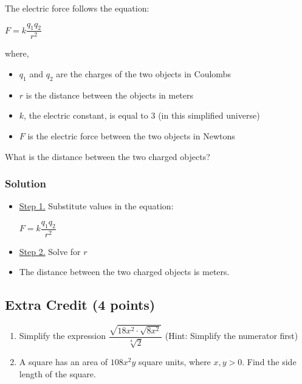 \documentclass{hw}
\begin{document}
The electric force follows the equation:
{\centering
$F = k \dfrac{q_1 q_2}{r^2}$
\par}

where,
\begin{itemize}
    \item $q_1$ and $q_2$ are the charges of the two objects in Coulombs
    \item $r$ is the distance between the objects in meters
    \item $k$, the electric constant, is equal to 3 (in this simplified universe)
    \item $F$ is the electric force between the two objects in Newtons 
\end{itemize}
\bigskip
What is the distance between the two charged objects?

\subsubsection*{\normalsize Solution}
\begin{itemize}
\item \uline{Step 1.} Substitute values in the equation:\\

{\centering
$F = k \dfrac{q_1 q_2}{r^2}$
\par}
\studentworkspace
\item \uline{Step 2.} Solve for $r$\\
\studentxlargeworkspace
\item The distance between the two charged objects is \blankline{8em} meters.
\end{itemize}

\newpage
\subsection*{\normalsize Extra Credit (4 points)}

\begin{enumerate}[label=\alph*.]
\item Simplify the expression $\dfrac{\sqrt{18x^2 \cdot \sqrt{8x^2}}}{\sqrt[4]{2}}$
(Hint: Simplify the numerator first)
\studentxxlargeworkspace
\item A square has an area of $108x^2y$ square units, where $x,y>0$. Find the side length of the square.
\studentxxlargeworkspace
\end{enumerate}
\end{document}
